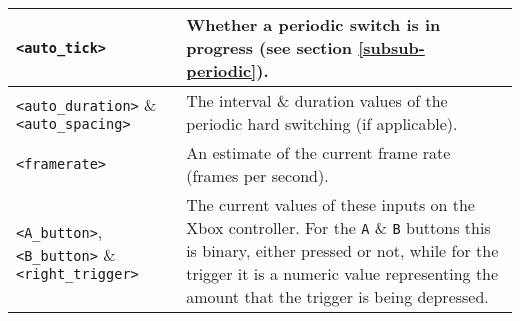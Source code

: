 \begin{center}
\begin{longtable}{| l | p{8cm} |}
\hline

\texttt{<auto\_tick>} & Whether a periodic switch is in progress (see section \ref{subsub-periodic}). \\

\hline

\texttt{<auto\_duration>} \& \texttt{<auto\_spacing>} & The interval \& duration values of the periodic hard switching (if applicable). \\

\hline

\texttt{<framerate>} & An estimate of the current frame rate (frames per second). \\

\hline

\texttt{<A\_button>}, \texttt{<B\_button>} \& \texttt{<right\_trigger>} & The current values of these inputs on the Xbox controller. For the \texttt{A} \& \texttt{B} buttons this is binary, either pressed or not, while for the trigger it is a numeric value representing the amount that the trigger is being depressed. \\

\hline

\end{longtable}
\end{center}




	
	
